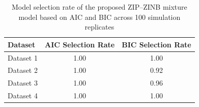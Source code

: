 \begin{table}[!h]
\caption{Model selection rate of the proposed ZIP--ZINB mixture model based on AIC and BIC across 100 simulation replicates}
\centering
\begin{tabular}{lcc}
\toprule
Dataset & AIC Selection Rate & BIC Selection Rate \\
\midrule
Dataset 1 & 1.00 & 1.00 \\
Dataset 2 & 1.00 & 0.92 \\
Dataset 3 & 1.00 & 0.96 \\
Dataset 4 & 1.00 & 1.00 \\
\bottomrule
\end{tabular}
\label{tab:sim_selection}
\end{table}
